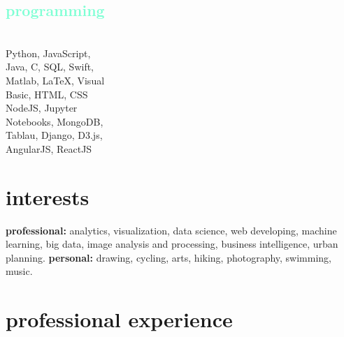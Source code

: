 \documentclass[english]{cv-style}          %
\begin{document}
\begin{aside}
\section{\textcolor{aquamarine}{programming}}\\
\vspace{0.2cm}
{Python, JavaScript,\\
\vspace{0.1cm}
Java, C, SQL, Swift,\\
\vspace{0.1cm}
Matlab, \LaTeX{}, Visual\\
\vspace{0.1cm}
Basic, HTML, CSS}\\
\vspace{0.5cm}
{NodeJS, Jupyter\\
\vspace{0.1cm}
Notebooks, MongoDB,\\
\vspace{0.1cm}
Tablau, Django, D3.js,\\
\vspace{0.1cm}
AngularJS, ReactJS}\\
%
\end{aside}


\section{interests}
  \vspace{-0.2cm}
\textbf{professional:} analytics, visualization, data science, web developing, machine learning, big data, image analysis and processing, business intelligence, urban planning. \textbf{personal:} drawing, cycling, arts, hiking, photography, swimming, music.

 {\vspace{-0.4cm}}
\section{professional experience}
\end{document}
